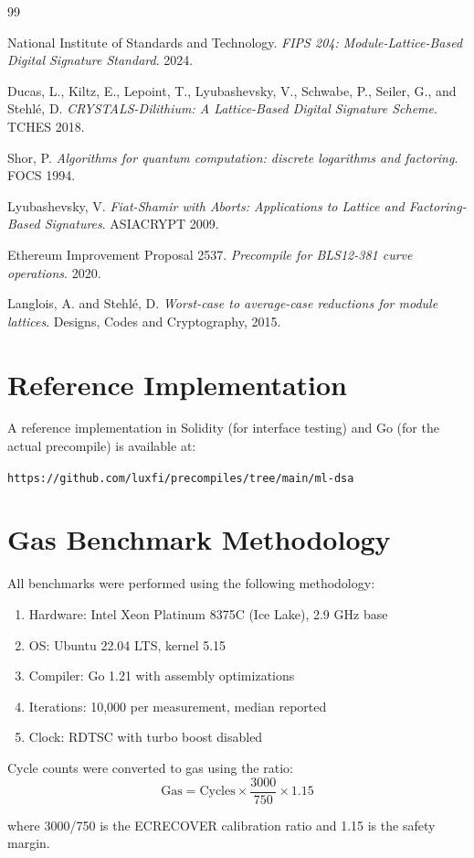 \documentclass[11pt,a4paper]{article}
\begin{document}

\begin{thebibliography}{99}

National Institute of Standards and Technology.
\textit{FIPS 204: Module-Lattice-Based Digital Signature Standard}.
2024.

Ducas, L., Kiltz, E., Lepoint, T., Lyubashevsky, V., Schwabe, P., Seiler, G., and Stehlé, D.
\textit{CRYSTALS-Dilithium: A Lattice-Based Digital Signature Scheme}.
TCHES 2018.

Shor, P.
\textit{Algorithms for quantum computation: discrete logarithms and factoring}.
FOCS 1994.

Lyubashevsky, V.
\textit{Fiat-Shamir with Aborts: Applications to Lattice and Factoring-Based Signatures}.
ASIACRYPT 2009.

Ethereum Improvement Proposal 2537.
\textit{Precompile for BLS12-381 curve operations}.
2020.

Langlois, A. and Stehlé, D.
\textit{Worst-case to average-case reductions for module lattices}.
Designs, Codes and Cryptography, 2015.

\end{thebibliography}

\appendix

\section{Reference Implementation}

A reference implementation in Solidity (for interface testing) and Go (for the actual precompile) is available at:

\texttt{https://github.com/luxfi/precompiles/tree/main/ml-dsa}

\section{Gas Benchmark Methodology}

All benchmarks were performed using the following methodology:

\begin{enumerate}
    \item Hardware: Intel Xeon Platinum 8375C (Ice Lake), 2.9 GHz base
    \item OS: Ubuntu 22.04 LTS, kernel 5.15
    \item Compiler: Go 1.21 with assembly optimizations
    \item Iterations: 10,000 per measurement, median reported
    \item Clock: RDTSC with turbo boost disabled
\end{enumerate}

Cycle counts were converted to gas using the ratio:
\[
\text{Gas} = \text{Cycles} \times \frac{3000}{750} \times 1.15
\]

where 3000/750 is the ECRECOVER calibration ratio and 1.15 is the safety margin.
\end{document}

